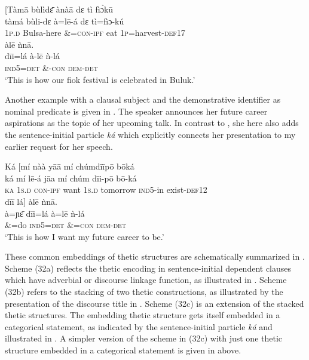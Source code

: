 \documentclass[output=paper]{langsci/langscibook}
\begin{document}
\ea\label{ex:schwarz:30}
\glll   \textup{[}Tàm\={a}  bùlìd\={ɛ}    ànà\={a}    dɛ  {tì   fì\`{ɔ}k\={u}}\\
     \textup{tàmá}  bùli-dɛ    à=l\={e}-á    dɛ  {tì=fìɔ}\textup{-kú}\\
       1\textsc{p}.\textsc{d}  Bulsa-here      \&=\textsc{con}-\textsc{ipf}    eat  1\textsc{p}=harvest-\textsc{def}17  \\
\glll   {d\={i}\={i}  lá\textup{] }} àl\={e}    ǹn\={a}.\\
    \textup{d\={i}i=lá}    à-l\={e}    {ǹ-lá}\\
     \textsc{ind5=det}     \&-\textsc{con}    \textsc{dem-det}\\
\glt ‘This is how our fiok festival is celebrated in Buluk.’
\z

Another example with a clausal subject and the demonstrative identifier as nominal predicate is given in . The speaker announces her future career aspirations as the topic of her upcoming talk. In contrast to , she here also adds the sentence-initial particle \textit{ká} which explicitly connects her presentation to my earlier request for her speech.

\ea\label{ex:schwarz:31}
\glll   Ká  \textup{[}mí    nàà    y\={a}\={a}    mí    chúmd\={i}\={i}p\={o}   { }         b\={o}ká\\
    \textup{ká}   mí    l\={e}-á      j\={a}a    mí    {chúm}        {d\={i}i-p\={o}}    {b\={o}-ká}\\
     \textsc{  ka}   1\textsc{s.d}  \textsc{con-ipf}    want  1\textsc{s}.\textsc{d } {tomorrow}     \textsc{ind}5-in     exist-\textsc{def}12\\
    {d\={i}\={i}   lá{]}} àl\={e}    \`{n}n\={a}. \\
    {à=ɲ\={ɛ}}  d\={i}i=lá    à=l\={e}    {ǹ-lá}\\
       \&=do  \textsc{ind}\textsc{5=}\textsc{det}  \&=\textsc{con}\textsc{ } \textsc{dem-det}\\
\glt ‘This is how I want my future career to be.’ \\
\z

These common embeddings of thetic structures are schematically summarized in . Scheme (32a) reflects the thetic encoding in sentence-initial dependent clauses which have adverbial or discourse linkage function, as illustrated in . Scheme (32b) refers to the stacking of two thetic constructions, as illustrated by the presentation of the discourse title in . Scheme (32c) is an extension of the stacked thetic structures. The embedding thetic structure gets itself embedded in a categorical statement, as indicated by the sentence-initial particle \textit{ká} and illustrated in . A simpler version of the scheme in (32c) with just one thetic structure embedded in a categorical statement is given in  above. 
\end{document}
